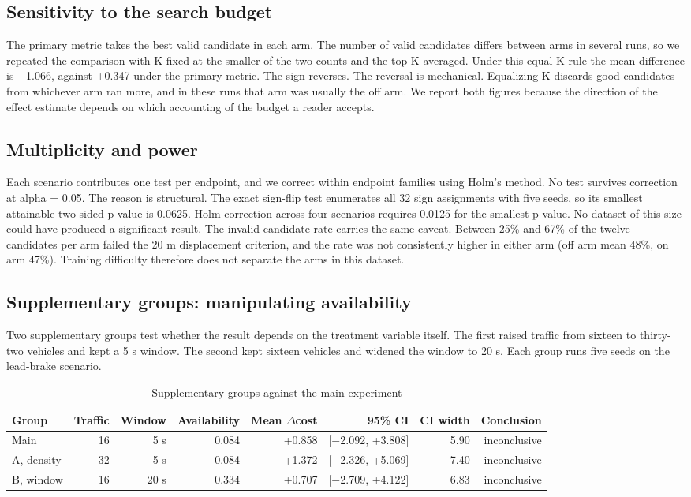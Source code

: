 \documentclass[journal]{IEEEtran}
\begin{document}
\subsection{Sensitivity to the search budget}
The primary metric takes the best valid candidate in each arm. The number of valid candidates differs
between arms in several runs, so we repeated the comparison with K fixed at the smaller of the two
counts and the top K averaged. Under this equal-K rule the mean difference is $-$1.066, against +0.347
under the primary metric. The sign reverses.
The reversal is mechanical. Equalizing K discards good candidates from whichever arm ran more, and in
these runs that arm was usually the off arm. We report both figures because the direction of the effect
estimate depends on which accounting of the budget a reader accepts.
\subsection{Multiplicity and power}
Each scenario contributes one test per endpoint, and we correct within endpoint families using Holm's
method. No test survives correction at alpha = 0.05.
The reason is structural. The exact sign-flip test enumerates all 32 sign assignments with five seeds,
so its smallest attainable two-sided p-value is 0.0625. Holm correction across four scenarios requires
0.0125 for the smallest p-value. No dataset of this size could have produced a significant result.
The invalid-candidate rate carries the same caveat. Between 25\% and 67\% of the twelve candidates per arm
failed the 20 m displacement criterion, and the rate was not consistently higher in either arm (off arm
mean 48\%, on arm 47\%). Training difficulty therefore does not separate the arms in this dataset.
\subsection{Supplementary groups: manipulating availability}
Two supplementary groups test whether the result depends on the treatment variable itself. The first
raised traffic from sixteen to thirty-two vehicles and kept a 5 s window. The second kept sixteen
vehicles and widened the window to 20 s. Each group runs five seeds on the lead-brake scenario.
\begin{table}[!t]
\centering
\small
\caption{Supplementary groups against the main experiment}
\begin{tabular}{lrrrrrrr}
\hline
Group & Traffic & Window & Availability & Mean $\Delta$cost & 95\% CI & CI width & Conclusion \\
\hline
Main & 16 & 5 s & 0.084 & +0.858 & [$-$2.092, +3.808] & 5.90 & inconclusive \\
A, density & 32 & 5 s & 0.084 & +1.372 & [$-$2.326, +5.069] & 7.40 & inconclusive \\
B, window & 16 & 20 s & 0.334 & +0.707 & [$-$2.709, +4.122] & 6.83 & inconclusive \\
\hline
\end{tabular}
\end{table}
\end{document}
